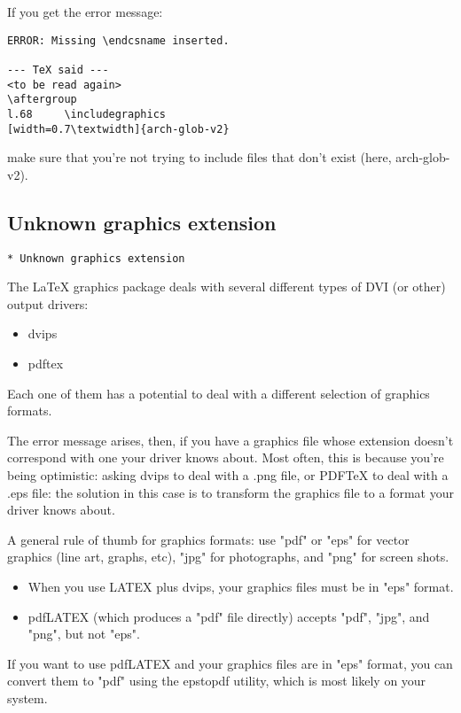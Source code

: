 \documentclass{mcreport}
\begin{document}
If you get the error message:

\begin{verbatim}
ERROR: Missing \endcsname inserted.

--- TeX said ---
<to be read again> 
\aftergroup 
l.68     \includegraphics
[width=0.7\textwidth]{arch-glob-v2}
\end{verbatim}

make sure that you're not trying to include files that don't exist (here,
arch-glob-v2).

\subsection{Unknown graphics extension}

\begin{verbatim}
* Unknown graphics extension
\end{verbatim}

The LaTeX graphics package deals with several different types of DVI
(or other) output drivers:

\begin{itemize}
    \item dvips
    \item pdftex
\end{itemize}

Each one of them has a potential to deal with a different selection
of graphics formats.

The error message arises, then, if you have a graphics file whose
extension doesn't correspond with one your driver knows about. Most
often, this is because you're being optimistic: asking dvips to deal
with a .png file, or PDFTeX to deal with a .eps file: the solution
in this case is to transform the graphics file to a format your
driver knows about.

A general rule of thumb for graphics formats: use "pdf" or "eps" for
vector graphics (line art, graphs, etc), "jpg" for photographs, and
"png" for screen shots.

\begin{itemize}
    \item When you use LATEX plus dvips, your graphics files must be in
    "eps" format.

    \item pdfLATEX (which produces a "pdf" file directly) accepts "pdf",
    "jpg", and "png", but not "eps".
\end{itemize}

If you want to use pdfLATEX and your graphics files are in "eps"
format, you can convert them to "pdf" using the epstopdf utility,
which is most likely on your system.
\end{document}
